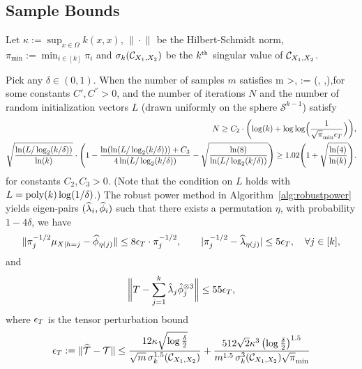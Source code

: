 \subsection{Sample Bounds}

Let $\kappa:=\sup_{x \in \Omega} k(x,x)$,   $\| \cdot\|_{}$ be the Hilbert-Schmidt norm, $\pi_{\min}:=\min_{i\in [k]} \pi_i$ and $\sigma_k(\mathcal{C}_{X_1, X_2})$ be the $k^{\tha}$ singular value of $\mathcal{C}_{X_1, X_2}$.

\begin{theorem}\label{thm:samplebound}
Pick  any $\delta\in (0,1)$. When the number of samples $m$ satisfies
\beq m >, 
\quad \rho:= \max\left(, ,\right),\eeq for some constants $C', C^{''}>0$, and the number of iterations $N$  and  the number of random initialization vectors $L$  (drawn uniformly on the sphere $\mathcal{S}^{k-1}$)  satisfy
\begin{align*}
N \geq C_2 \cdot \biggl( \log(k) + \log\log\Bigl(
\frac{1}{\sqrt{\pi}_{\min}\epsilon_T} \Bigr) \biggr),\\
\sqrt{\frac{\ln(L/\log_2(k/\delta))}{\ln(k)}}
\cdot \Biggl( 1 - \frac{\ln(\ln(L/\log_2(k/\delta))) +
C_3}{4\ln(L/\log_2(k/\delta))} -
\sqrt{\frac{\ln(8)}{\ln(L/\log_2(k/\delta))}} \Biggr)
\geq 1.02 \Biggl( 1 + \sqrt{\frac{\ln(4)}{\ln(k)}}
\Biggr)
.
\end{align*}
for constants $C_2,C_3>0$. (Note that the condition on $L$ holds with $L = \operatorname{poly}(k) \log(1/\delta)$.) The robust power method in Algorithm~\ref{alg:robustpower} yields eigen-pairs $(\widehat{\lambda}_i, \widehat{\phi}_i)$ such that there exists a permutation $\eta$, with probability $1-4\delta$, we have
\[
\|\pi^{-1/2}_{j} \mu_{X|h=j}-\widehat{\phi}_{\eta(j)}\| \leq 8 \epsilon_T \cdot\pi^{-1/2}_{j}
, \qquad
|\pi^{-1/2}_{j}-\widehat{\lambda}_{\eta(j)}| \leq  5\epsilon_T, \quad \forall j \in [k]
,
\]
and
\[
\biggl\|
T - \sum_{j=1}^k \hat\lambda_j \hat{\phi}_j^{\otimes 3}
\biggr\| \leq 55\epsilon_T,
\] where $\epsilon_T$ is the tensor perturbation bound
\[ \epsilon_T := \|\widehat{{\mathcal{T}}} - {\mathcal{T}}\| \leq 
\frac{12 \kappa \sqrt{\log\frac{\delta}{2}}}{\sqrt{m} \, \sigma_k^{1.5}(\mathcal{C}_{X_1, X_2})} + \frac{512 \sqrt{2} \kappa^3 \left(\log\frac{\delta}{2}\right)^{1.5}}{m^{1.5} \,\sigma_k^{3}(\mathcal{C}_{X_1, X_2}) \sqrt{\pi}_{\min}}\]

\end{theorem}

